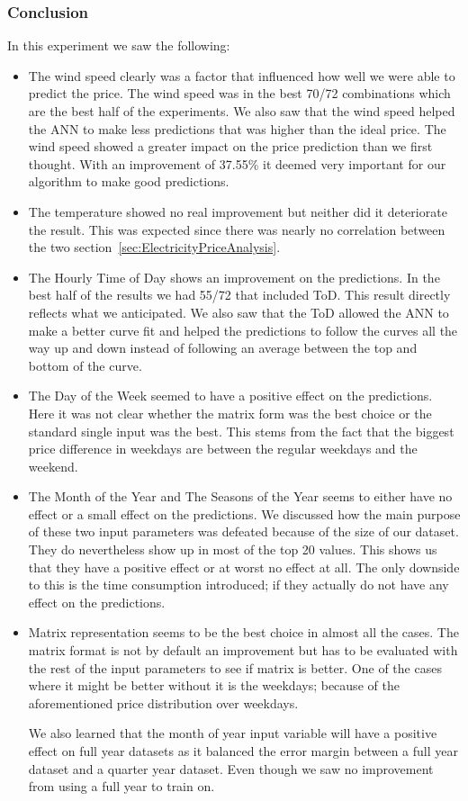 \subsubsection{Conclusion}
In this experiment we saw the following:
\begin{itemize}
	\item The wind speed clearly was a factor that influenced how well we were able to predict the price. The wind speed was in the best 70/72 combinations which are the best half of the experiments. We also saw that the wind speed helped the ANN to make less predictions that was higher than the ideal price. The wind speed showed a greater impact on the price prediction than we first thought. With an improvement of 37.55\% it deemed very important for our algorithm to make good predictions.
	\item The temperature showed no real improvement but neither did it deteriorate the result. This was expected since there was nearly no correlation between the two section~\ref{sec:ElectricityPriceAnalysis}.
	\item The Hourly Time of Day shows an improvement on the predictions. In the best half of the results we had 55/72 that included ToD. This result directly reflects what we anticipated. We also saw that the ToD allowed the ANN to make a better curve fit and helped the predictions to follow the curves all the way up and down instead of following an average between the top and bottom of the curve.
	\item The Day of the Week seemed to have a positive effect on the predictions. Here it was not clear whether the matrix form was the best choice or the standard single input was the best. This stems from the fact that the biggest price difference in weekdays are between the regular weekdays and the weekend.
	\item The Month of the Year and The Seasons of the Year seems to either have no effect or a small effect on the predictions. We discussed how the main purpose of these two input parameters was defeated because of the size of our dataset. They do nevertheless show up in most of the top 20 values. This shows us that they have a positive effect or at worst no effect at all. The only downside to this is the time consumption introduced; if they actually do not have any effect on the predictions.
	\item Matrix representation seems to be the best choice in almost all the cases. The matrix format is not by default an improvement but has to be evaluated with the rest of the input parameters to see if matrix is better. One of the cases where it might be better without it is the weekdays; because of the aforementioned price distribution over weekdays.

We also learned that the month of year input variable will have a positive effect on full year datasets as it balanced the error margin between a full year dataset and a quarter year dataset. Even though we saw no improvement from using a full year to train on.
\end{itemize}

